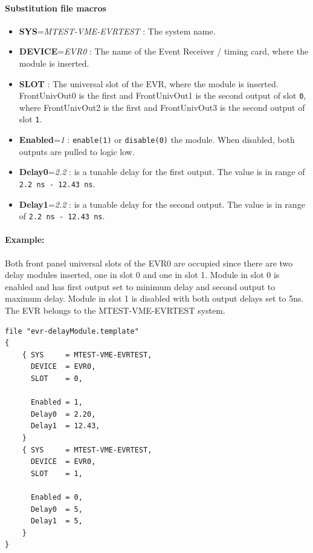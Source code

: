 \documentclass[12pt,a4paper]{article}
\begin{document}
\paragraph{Substitution file macros}
\begin{itemize}
\item
	\textbf{SYS}=\emph{MTEST-VME-EVRTEST} : The system name.
\item
	\textbf{DEVICE}=\emph{EVR0} : The name of the Event Receiver / timing card, where the module is inserted.
\item
  \textbf{SLOT} : The universal slot of the EVR, where the module is inserted. FrontUnivOut0 is the first and FrontUnivOut1 is the second output of slot \texttt{0}, where FrontUnivOut2 is the first and FrontUnivOut3 is the second output of slot \texttt{1}.
\item
  \textbf{Enabled}=\emph{1} : \texttt{enable(1)} or \texttt{disable(0)} the module.
  When disabled, both outputs are pulled to logic low.
\item
  \textbf{Delay0}=\emph{2.2} : is a tunable delay for the first output. The value is
  in range of \texttt{2.2 ns - 12.43 ns}.
\item
  \textbf{Delay1}=\emph{2.2} : is a tunable delay for the second output. The value
  is in range of \texttt{2.2 ns - 12.43 ns}.
\end{itemize}

\paragraph{Example:} Both front panel universal slots of the EVR0 are occupied since there are
two delay modules inserted, one in slot 0 and one in slot 1. Module in
slot 0 is enabled and has first output set to minimum delay and second
output to maximum delay. Module in slot 1 is disabled with both output
delays set to 5ns. The EVR belongs to the MTEST-VME-EVRTEST system.

\begin{verbatim}
file "evr-delayModule.template"
{
    { SYS     = MTEST-VME-EVRTEST,
      DEVICE  = EVR0,
      SLOT    = 0,

      Enabled = 1,
      Delay0  = 2.20,
      Delay1  = 12.43,
    }
    { SYS     = MTEST-VME-EVRTEST,
      DEVICE  = EVR0,
      SLOT    = 1,

      Enabled = 0,
      Delay0  = 5,
      Delay1  = 5,
    }
}
\end{verbatim}
\end{document}
